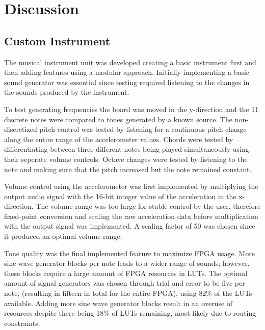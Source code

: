 \section{Discussion}
\subsection{Custom Instrument}
The musical instrument unit was developed creating a basic instrument first and then adding features using a modular approach. 
 Initially implementing a basic sound generator was essential since testing required listening to the changes in the sounds produced by the instrument.

To test generating frequencies the board was moved in the y-direction and the 11 discrete notes were compared to tones generated by a known source. The non-discretized pitch control was tested by listening for a continuous pitch change along the entire range of the accelerometer values. Chords were tested by differentiating between three different notes being played simultaneously using their seperate volume controls. Octave changes were tested by listening to the note and making sure that the pitch increased but the note remained constant.

Volume control using the accelerometer was first implemented by multiplying the output audio signal with the 16-bit integer value of the acceleration in the x-direction.
 The volume range was too large for stable control by the user, therefore fixed-point conversion and scaling the raw acceleration data before multiplication with the output signal was implemented.
 A scaling factor of 50 was chosen since it produced an optimal volume range.

Tone quality was the final implemented feature to maximize FPGA usage.
 More sine wave generator blocks per note leads to a wider range of sounds; however, these blocks require a large amount of FPGA resources in LUTs.
 The optimal amount of signal generators was chosen through trial and error to be five per note, (resulting in fifteen in total for the entire FPGA), using 82\% of the LUTs available.
 Adding more sine wave generator blocks result in an overuse of resources despite there being 18\% of LUTs remaining, most likely due to routing constraints.


